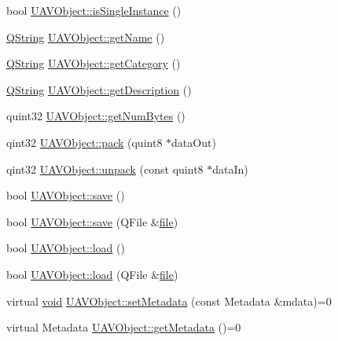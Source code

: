 \begin{DoxyCompactItemize}
\item 
bool \hyperlink{group___u_a_v_objects_plugin_gac05d3c2bd0fd07947707562f66ddfc18}{U\-A\-V\-Object\-::is\-Single\-Instance} ()
\item 
\hyperlink{group___u_a_v_objects_plugin_gab9d252f49c333c94a72f97ce3105a32d}{Q\-String} \hyperlink{group___u_a_v_objects_plugin_ga92eb502fc16ba82b924a430acaa55f46}{U\-A\-V\-Object\-::get\-Name} ()
\item 
\hyperlink{group___u_a_v_objects_plugin_gab9d252f49c333c94a72f97ce3105a32d}{Q\-String} \hyperlink{group___u_a_v_objects_plugin_gae829aa2dbab661a65f9f805caa8c67d1}{U\-A\-V\-Object\-::get\-Category} ()
\item 
\hyperlink{group___u_a_v_objects_plugin_gab9d252f49c333c94a72f97ce3105a32d}{Q\-String} \hyperlink{group___u_a_v_objects_plugin_ga319c487a42b628a2e83274c89fa77625}{U\-A\-V\-Object\-::get\-Description} ()
\item 
quint32 \hyperlink{group___u_a_v_objects_plugin_gafa1288a7ab0b65c3f81c4312d7cfee78}{U\-A\-V\-Object\-::get\-Num\-Bytes} ()
\item 
qint32 \hyperlink{group___u_a_v_objects_plugin_ga4afcaf928b2868be5a57d96a2b251318}{U\-A\-V\-Object\-::pack} (quint8 $\ast$data\-Out)
\item 
qint32 \hyperlink{group___u_a_v_objects_plugin_ga4ec5169680d4a03161752e98fd98a3b6}{U\-A\-V\-Object\-::unpack} (const quint8 $\ast$data\-In)
\item 
bool \hyperlink{group___u_a_v_objects_plugin_ga7c5e9973653217674183bfa3ba10e217}{U\-A\-V\-Object\-::save} ()
\item 
bool \hyperlink{group___u_a_v_objects_plugin_ga6b936966d89fb80b1138100edcd3e4cc}{U\-A\-V\-Object\-::save} (Q\-File \&\hyperlink{uavobjecttemplate_8m_a97c04efa65bcf0928abf9260bc5cbf46}{file})
\item 
bool \hyperlink{group___u_a_v_objects_plugin_ga8e49ecfdebf22f4834d1fc22d3effae7}{U\-A\-V\-Object\-::load} ()
\item 
bool \hyperlink{group___u_a_v_objects_plugin_ga0c4bcaec65373c03a2dbf22beae1e8a3}{U\-A\-V\-Object\-::load} (Q\-File \&\hyperlink{uavobjecttemplate_8m_a97c04efa65bcf0928abf9260bc5cbf46}{file})
\item 
virtual \hyperlink{group___u_a_v_objects_plugin_ga444cf2ff3f0ecbe028adce838d373f5c}{void} \hyperlink{group___u_a_v_objects_plugin_ga6cca5e5bf5d4f7ecfb03ef7cc9a93a95}{U\-A\-V\-Object\-::set\-Metadata} (const Metadata \&mdata)=0
\item 
virtual Metadata \hyperlink{group___u_a_v_objects_plugin_gaadeb5af3a70679bcb2b6360274e9c7de}{U\-A\-V\-Object\-::get\-Metadata} ()=0

\end{DoxyCompactItemize}
